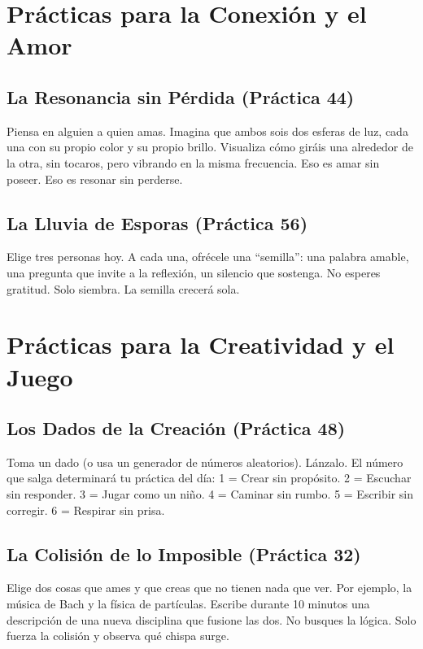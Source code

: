 \documentclass[12pt,openany]{book}
\begin{document}
\chapter{Prácticas para la Conexión y el Amor}

\section{La Resonancia sin Pérdida (Práctica 44)}
\begin{practica}
Piensa en alguien a quien amas. Imagina que ambos sois dos esferas de
luz, cada una con su propio color y su propio brillo. Visualiza cómo
giráis una alrededor de la otra, sin tocaros, pero vibrando en la misma
frecuencia. Eso es amar sin poseer. Eso es resonar sin perderse.
\end{practica}

\section{La Lluvia de Esporas (Práctica 56)}
\begin{practica}
Elige tres personas hoy. A cada una, ofrécele una ``semilla'': una
palabra amable, una pregunta que invite a la reflexión, un silencio que
sostenga. No esperes gratitud. Solo siembra. La semilla crecerá sola.
\end{practica}

\chapter{Prácticas para la Creatividad y el Juego}

\section{Los Dados de la Creación (Práctica 48)}
\begin{practica}
Toma un dado (o usa un generador de números aleatorios). Lánzalo. El
número que salga determinará tu práctica del día: 1 = Crear sin
propósito. 2 = Escuchar sin responder. 3 = Jugar como un niño. 4 =
Caminar sin rumbo. 5 = Escribir sin corregir. 6 = Respirar sin prisa.
\end{practica}

\section{La Colisión de lo Imposible (Práctica 32)}
\begin{practica}
Elige dos cosas que ames y que creas que no tienen nada que ver. Por
ejemplo, la música de Bach y la física de partículas. Escribe durante
10 minutos una descripción de una nueva disciplina que fusione las dos.
No busques la lógica. Solo fuerza la colisión y observa qué chispa surge.
\end{practica}
\end{document}
